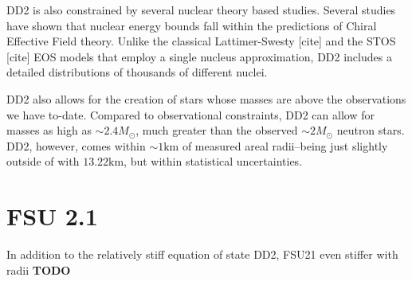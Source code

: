 DD2 is also constrained by several nuclear theory based studies.
Several studies have shown that nuclear energy bounds fall within the predictions of Chiral Effective Field theory.
Unlike the classical Lattimer-Swesty [cite] and the STOS [cite] EOS models that employ a single nucleus approximation, DD2 includes a detailed distributions of thousands of different nuclei.

DD2 also allows for the creation of stars whose masses are above the observations we have to-date.
Compared to observational constraints, DD2 can allow for masses as high as $\sim 2.4 M_\odot$, much greater than the observed $\sim 2 M_\odot$ neutron stars.
DD2, however, comes within $\sim 1 \textrm{km}$ of measured areal radii--being just slightly outside of with $13.22 \textrm{km}$, but within statistical uncertainties.

\section{FSU 2.1}

In addition to the relatively stiff equation of state DD2, FSU21 even stiffer with radii \textbf{TODO}



